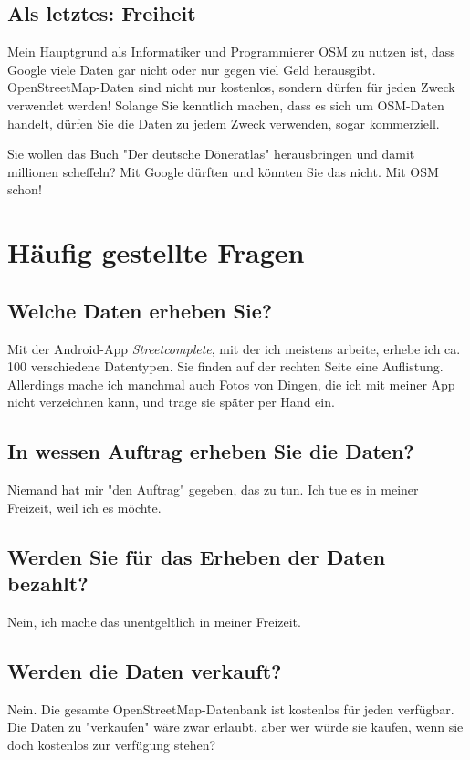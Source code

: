 \documentclass[10pt,foldmark,notumble]{leaflet}
\begin{document}
    \subsection{Als letztes: Freiheit}
    Mein Hauptgrund als Informatiker und Programmierer OSM zu nutzen ist, dass Google viele Daten gar nicht oder nur gegen viel Geld herausgibt.
    OpenStreetMap-Daten sind nicht nur kostenlos, sondern dürfen für jeden Zweck verwendet werden! Solange Sie kenntlich machen, dass es sich um OSM-Daten handelt, dürfen Sie die Daten zu jedem Zweck verwenden, sogar kommerziell.

    Sie wollen das Buch "Der deutsche Döneratlas" herausbringen und damit millionen scheffeln?
    Mit Google dürften und könnten Sie das nicht.
    Mit OSM schon!


    \section{Häufig gestellte Fragen}
    \subsection{Welche Daten erheben Sie?}
    Mit der Android-App \textit{Streetcomplete}, mit der ich meistens arbeite, erhebe ich ca. 100 verschiedene Datentypen.
    Sie finden auf der rechten Seite eine Auflistung.
    Allerdings mache ich manchmal auch Fotos von Dingen, die ich mit meiner App nicht verzeichnen kann, und trage sie später per Hand ein.

    \subsection{In wessen Auftrag erheben Sie die Daten?}
    Niemand hat mir "den Auftrag" gegeben, das zu tun.
    Ich tue es in meiner Freizeit, weil ich es möchte.

    \subsection{Werden Sie für das Erheben der Daten bezahlt?}
    Nein, ich mache das unentgeltlich in meiner Freizeit.

    \subsection{Werden die Daten verkauft?}
    Nein.
    Die gesamte OpenStreetMap-Datenbank ist kostenlos für jeden verfügbar.
    Die Daten zu "verkaufen" wäre zwar erlaubt, aber wer würde sie kaufen, wenn sie doch kostenlos zur verfügung stehen?
\end{document}

